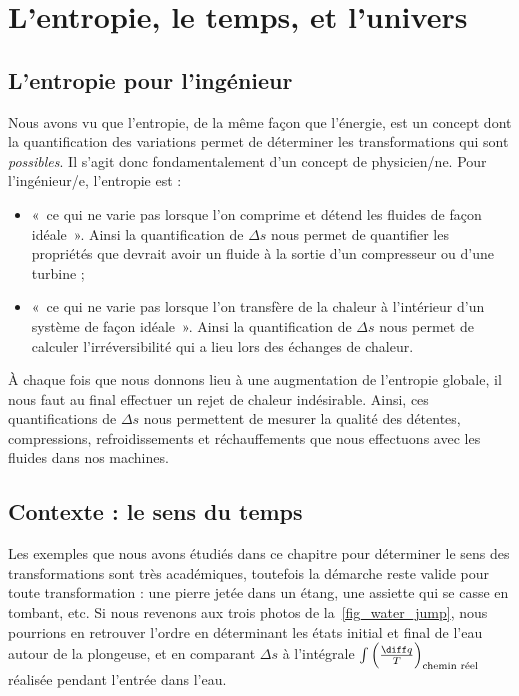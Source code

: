 \section{L’entropie, le temps, et l’univers}

	\subsection{L’entropie pour l’ingénieur}

		Nous avons vu que l’entropie, de la même façon que l’énergie, est un concept dont la quantification des variations permet de déterminer les transformations qui sont \emph{possibles}. Il s’agit donc fondamentalement d’un concept de physicien/ne. Pour l’ingénieur/e, l’entropie est :
		\begin{itemize}
			\item «~ce qui ne varie pas lorsque l’on comprime et détend les fluides de façon idéale~». Ainsi la quantification de $\Delta s$ nous permet de quantifier les propriétés que devrait avoir un fluide à la sortie d’un compresseur ou d’une turbine ;
			\item «~ce qui ne varie pas lorsque l’on transfère de la chaleur à l’intérieur d’un système de façon idéale~». Ainsi la quantification de $\Delta s$ nous permet de calculer l’irréversibilité qui a lieu lors des échanges de chaleur.
		\end{itemize}

	À chaque fois que nous donnons lieu à une augmentation de l’entropie globale, il nous faut au final effectuer un rejet de chaleur indésirable. Ainsi, ces quantifications de $\Delta s$ nous permettent de mesurer la qualité des détentes, compressions, refroidissements et réchauffements que nous effectuons avec les fluides dans nos machines.

	\subsection{Contexte : le sens du temps}
				
		Les exemples que nous avons étudiés dans ce chapitre pour déterminer le sens des transformations sont très académiques, toutefois la démarche reste valide pour toute transformation : une pierre jetée dans un étang, une assiette qui se casse en tombant, etc. Si nous revenons aux trois photos de la~\cref{fig_water_jump}, nous pourrions en retrouver l’ordre en déterminant les états initial et final de l’eau autour de la plongeuse, et en comparant $\Delta s$ à l’intégrale $\int \left(\frac{\diff q}{T}\right)_\text{chemin réel}$ réalisée pendant l’entrée dans l’eau.
		
